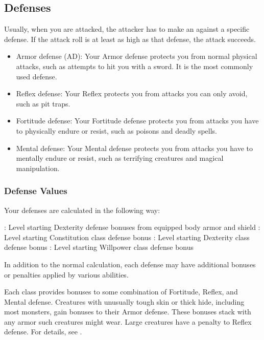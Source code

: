     \subsection{Defenses}\label{Defenses}
        Usually, when you are attacked, the attacker has to make an  against a specific defense.
        If the attack roll is at least as high as that defense, the attack succeeds.
        \begin{itemize}
            \item Armor defense (AD): Your Armor defense protects you from normal physical attacks, such as attempts to hit you with a sword.
                It is the most commonly used defense.
            \item Reflex defense: Your Reflex protects you from attacks you can only avoid, such as pit traps.
            \item Fortitude defense: Your Fortitude defense protects you from attacks you have to physically endure or resist, such as poisons and deadly spells.
            \item Mental defense: Your Mental defense protects you from attacks you have to mentally endure or resist, such as terrifying creatures and magical manipulation.
        \end{itemize}

        \subsubsection{Defense Values}\label{Defense Values}

            Your defenses are calculated in the following way:
            \begin{itemize}
                : Level \add starting Dexterity \add defense bonuses from equipped body armor and shield
                : Level \add starting Constitution \add class defense bonus
                : Level \add starting Dexterity \add class defense bonus
                : Level \add starting Willpower \add class defense bonus
            \end{itemize}
            In addition to the normal calculation, each defense may have additional bonuses or penalties applied by various abilities.

             Each class provides bonuses to some combination of Fortitude, Reflex, and Mental defense.
             Creatures with unusually tough skin or thick hide, including most monsters, gain bonuses to their Armor defense.
            These bonuses stack with any armor such creatures might wear.
             Large creatures have a penalty to Reflex defense.
            For details, see .

